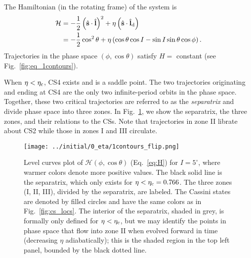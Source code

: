 \documentclass[
        fleqn,
        usenatbib,
        referee,
    ]{mnras}
\newcommand*{\bm}[1]{\boldsymbol{\mathbf{#1}}}
\newcommand*{\uv}[1]{\hat{\bm{#1}}}
\newcommand*{\p}[1]{\left(#1\right)}
\begin{document}
The Hamiltonian (in the rotating frame) of the system is
\begin{align}
    \mathcal{H} &= -\frac{1}{2}\p{\uv{s} \cdot \uv{l}}^2
            + \eta \p{\uv{s} \cdot \uv{l}_{\rm d}}\nonumber\\
        &= -\frac{1}{2}\cos^2\theta
            + \eta \p{\cos \theta \cos I - \sin I \sin \theta \cos \phi}
                \label{eq:H}.
\end{align}
Trajectories in the phase space $\p{\phi, \cos \theta}$ satisfy $H = $ constant
(see Fig.~\autoref{fig:eq_1contours}).

When $\eta < \eta_{\rm c}$, CS4 exists and is a saddle point. The two
trajectories originating and ending at CS4 are the only two infinite-period
orbits in the phase space. Together, these two critical trajectories are
referred to as the \emph{separatrix} and divide phase space into three zones. In
Fig.~\ref{fig:eq_1contours}, we show the separatrix, the three zones, and their
relations to the CSs. Note that trajectories in zone II librate about CS2
while those in zones I and III circulate.
\begin{figure*}
    \centering
    \texttt{[image: ../initial/0\_eta/1contours\_flip.png]}
    \caption{Level curves plot of $\mathcal{H}\p{\phi, \cos \theta}$
    (Eq.~\eqref{eq:H}) for $I = 5^\circ$, where warmer colors denote more
    positive values. The black solid line is the separatrix, which only exists
    for $\eta < \eta_{\rm c} = 0.766$. The three zones (I, II, III), divided by
    the separatrix, are labeled. The Cassini states are denoted by filled
    circles and have the same colors as in Fig.~\ref{fig:cs_locs}. The interior
    of the separatrix, shaded in grey, is formally only defined for $\eta <
    \eta_{\rm c}$, but we may identify the points in phase space that flow into
    zone II when evolved forward in time (decreasing $\eta$ adiabatically); this
    is the shaded region in the top left panel, bounded by the black dotted
    line.}\label{fig:eq_1contours}
\end{figure*}
\end{document}
